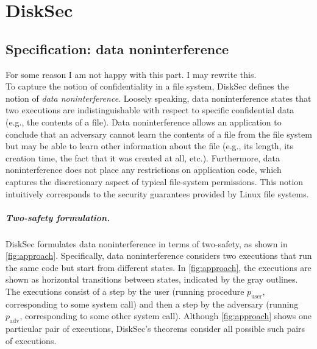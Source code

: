 \chapter{DiskSec}


\section{Specification: data noninterference}
\label{s:spec}

{\color{red} For some reason I am not happy with this part. I may rewrite this. }\\
To capture the notion of confidentiality in a file system, DiskSec
defines the notion of \emph{data noninterference}.  Loosely speaking,
data noninterference states that two executions are indistinguishable
with respect to specific confidential data (e.g., the contents of
a file).  Data noninterference allows an application to conclude that
an adversary cannot learn the contents of a file from the file system
but may be able to learn other information about the file (e.g., its
length, its creation time, the fact that it was created at all, etc.).
Furthermore, data noninterference does not place any restrictions on
application code, which captures the discretionary aspect of typical
file-system permissions.  This notion intuitively corresponds to the
security guarantees provided by Linux file systems.

%    

\paragraph{Two-safety formulation.}
DiskSec formulates data noninterference in terms of two-safety, as shown
in \ref{fig:approach}.  Specifically, data noninterference considers
two executions that run the same code but start from different states.  In
\ref{fig:approach}, the executions are shown as horizontal transitions
between states, indicated by the gray outlines.  The executions
consist of a step by the user (running procedure $p_\mathrm{user}$,
corresponding to some system call) and then a step by the adversary
(running $p_\mathrm{adv}$, corresponding to some other system call).
Although \ref{fig:approach} shows one particular pair of executions,
DiskSec's theorems consider all possible such pairs of executions.

